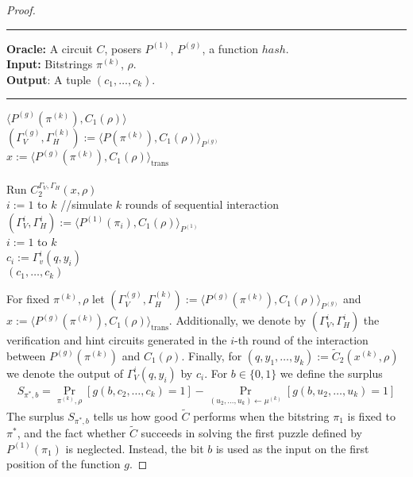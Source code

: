 \begin{proof}
\begin{codeblock}
  \medskip \hrule \medskip
  \textbf{Oracle:}  A circuit $C$, posers $P^{(1)}$, $P^{(g)}$, a function $hash$.\\
  \textbf{Input:} Bitstrings $\pi^{(k)}$, $\rho$.\\
  \textbf{Output}: A tuple $(c_1, \dots, c_k)$.
  \medskip\hrule\medskip
  \Run $\langle P^{(g)}(\pi^{(k)}), C_1(\rho) \rangle$ \\
  \IndI $(\Gamma_V^{(g)}, \Gamma_H^{(k)}) := \langle P(\pi^{(k)}), C_1(\rho) \rangle_{P^{(g)}}$ \\
  \IndI $x := \langle P^{(g)}(\pi^{(k)}), C_1(\rho) \rangle_{\text{trans}}$ \\ \\
  Run $C_2^{\Gamma_V, \Gamma_H} (x, \rho)$ \\
  \For $i:=1$ to $k$ \Do \IndII //simulate $k$ rounds of sequential interaction \\
  \IndI $(\Gamma_V^{i}, \Gamma_H^{i}) := \langle P^{(1)}(\pi_i), C_1(\rho) \rangle_{P^{(1)}} $\\
  \For $i:=1$ to $k$ \Do \\
  \IndI $c_i := \Gamma_v^{i}(q, y_i)$\\
  \return $(c_1, \dots, c_k)$
\end{codeblock}
%

For fixed $\pi^{(k)}, \rho$ let $(\Gamma_V^{(g)}, \Gamma_H^{(k)}) := \langle P^{(g)}(\pi^{(k)}), C_1(\rho) \rangle_{P^{(g)}}$
and $x := \langle P^{(g)}(\pi^{(k)}), C_1(\rho) \rangle_{\text{trans}}$.
Additionally, we denote by $(\Gamma_V^{i}, \Gamma_H^{i})$ the verification and hint circuits generated in the $i$-th
round of the interaction between $P^{(g)}(\pi^{(k)})$ and $C_1(\rho)$.
Finally, for $(q,y_1, \dots, y_k) := \widetilde{C}_2(x^{(k)}, \rho)$ we denote the output of $\Gamma_V^i(q,y_i)$ by $c_i$.
For $b \in \{0,1\}$ we define the surplus
\begin{align}
  \label{eq:s_pi_b}
S_{\pi^*, b} = \underset{\pi^{(k)}, \rho}{\Pr}\left[g(b, c_2, \dots, c_k) = 1\right] - \underset{(u_2, \dots, u_k) \leftarrow \mu^{(k)}}{\Pr}\left[g(b, u_2, \dots, u_k) = 1\right]
\end{align}
%
The surplus $S_{\pi^*, b}$ tells us how good $\widetilde{C}$ performs when the bitstring $\pi_1$ is fixed to $\pi^*$,
and the fact whether $\widetilde{C}$ succeeds in solving the first puzzle defined by $P^{(1)}(\pi_1)$ is neglected.
Instead, the bit $b$ is used as the input on the first position of the function $g$.


\end{proof}
